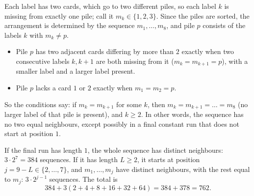 Each label has two cards, which go to two different piles, so each label $k$ is missing from exactly one pile; call it $m_k\in\{1,2,3\}$. Since the piles are sorted, the arrangement is determined by the sequence $m_1,\dots,m_8$, and pile $p$ consists of the labels $k$ with $m_k\ne p$.
\begin{itemize}
\item Pile $p$ has two adjacent cards differing by more than $2$ exactly when two consecutive labels $k,k+1$ are both missing from it ($m_k=m_{k+1}=p$), with a smaller label and a larger label present.
\item Pile $p$ lacks a card $1$ or $2$ exactly when $m_1=m_2=p$.
\end{itemize}
So the conditions say: if $m_k=m_{k+1}$ for some $k$, then $m_k=m_{k+1}=\dots=m_8$ (no larger label of that pile is present), and $k\ge2$. In other words, the sequence has no two equal neighbours, except possibly in a final constant run that does not start at position $1$.

If the final run has length $1$, the whole sequence has distinct neighbours: $3\cdot2^7=384$ sequences. If it has length $L\ge2$, it starts at position $j=9-L\in\{2,\dots,7\}$, and $m_1,\dots,m_j$ have distinct neighbours, with the rest equal to $m_j$: $3\cdot2^{j-1}$ sequences. The total is
\[384+3\left(2+4+8+16+32+64\right)=384+378=\boxed{762}.\]
